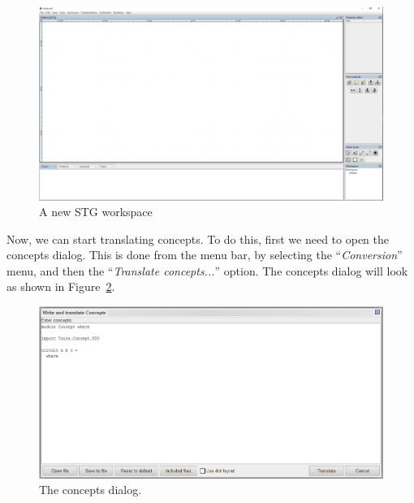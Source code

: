 \documentclass[british,technote,compsoc]{IEEEtran}
\begin{document}
\begin{figure}[H]
\begin{centering}
\includegraphics[scale=0.2]{images/new_stg_screenshot}
\par\end{centering}

\begin{centering}
\protect\caption{\label{fig:blank_stg_work}A new STG workspace}

\par\end{centering}

\end{figure}

Now, we can start translating concepts. To do this, first we need to open the concepts dialog.  This is done from the menu bar, by selecting the ``\emph{Conversion}'' menu,
 and then the ``\emph{Translate concepts...}'' option. The concepts dialog will look as shown in Figure~\ref{fig:concepts_dialog_screenshot}.

\begin{figure}[H]
\begin{centering}
\includegraphics[scale=0.5]{images/concepts_dialog_screenshot.png}
\par\end{centering}

\begin{centering}
\protect\caption{\label{fig:concepts_dialog_screenshot}The concepts dialog.}

\par\end{centering}

\end{figure}
\end{document}

